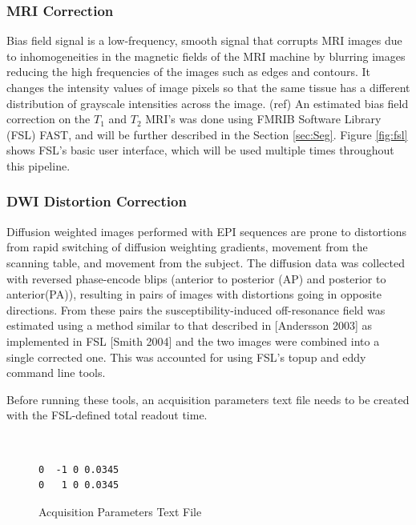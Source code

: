 \subsubsection{MRI Correction}

Bias field signal is a low-frequency, smooth signal that corrupts MRI images due to inhomogeneities in the magnetic fields of the MRI machine by blurring images reducing the high frequencies of the images such as edges and contours. It changes the intensity values of image pixels so that the same tissue has a different distribution of grayscale intensities across the image. (ref) An estimated bias field correction on the $T_1$ and $T_2$ MRI's was done using FMRIB Software Library (FSL) FAST, and will be further described in the Section \ref{sec:Seg}. Figure \ref{fig:fsl} shows FSL's basic user interface, which will be used multiple times throughout this pipeline. 

\subsubsection{DWI Distortion Correction}

Diffusion weighted images performed with EPI sequences are prone to distortions from rapid switching of diffusion weighting gradients, movement from the scanning table, and movement from the subject. The diffusion data was collected with reversed phase-encode blips (anterior to posterior (AP) and posterior to anterior(PA)), resulting in pairs of images with distortions going in opposite directions. From these pairs the susceptibility-induced off-resonance field was estimated using a method similar to that described in [Andersson 2003] as implemented in FSL [Smith 2004] and the two images were combined into a single corrected one. This was accounted for using FSL's topup and eddy command line tools.

Before running these tools, an acquisition parameters text file needs to be created with the FSL-defined total readout time. 

\begin{figure}[H]
\centering
{\tt
\begin{varwidth}{\linewidth}
\begin{verbatim}
0  -1 0 0.0345
0   1 0 0.0345
\end{verbatim}
\end{varwidth}
}
\label{fig:acq}
\caption{Acquisition Parameters Text File}
\end{figure}

